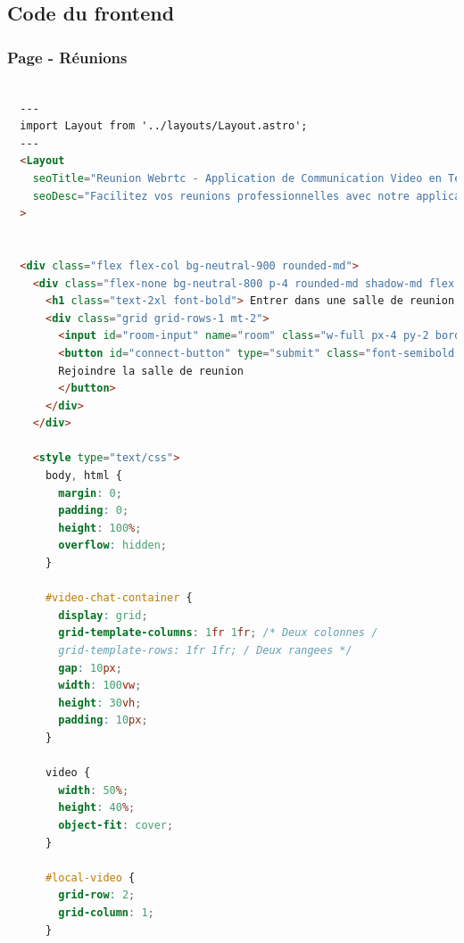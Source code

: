 \documentclass[12pt, a4paper, oneside]{thesis}
\begin{document}
\subsection{Code du frontend}

\subsubsection{Page - Réunions}

\begin{lstlisting}[language=HTML, caption={Page - Réunions}, label=Page - Reunions]

  ---
  import Layout from '../layouts/Layout.astro';
  ---
  <Layout
    seoTitle="Reunion Webrtc - Application de Communication Video en Temps Reel | Acody"
    seoDesc="Facilitez vos reunions professionnelles avec notre application de projet Webrtc. Effectuez des appels video en temps reel, abandonnez les appels en un clic, et gerez facilement le son et la camera. Optimisez votre collaboration a distance avec des fonctionnalites simples et efficaces."
  >
  
  
  <div class="flex flex-col bg-neutral-900 rounded-md">
    <div class="flex-none bg-neutral-800 p-4 rounded-md shadow-md flex flex-col">
      <h1 class="text-2xl font-bold"> Entrer dans une salle de reunion </h1>
      <div class="grid grid-rows-1 mt-2">
        <input id="room-input" name="room" class="w-full px-4 py-2 border rounded-md focus:outline-none focus:border-teal-500 bg-neutral-700 col-span-6" placeholder="Numero de votre salle de reunion" />
        <button id="connect-button" type="submit" class="font-semibold w-full bg-teal-500 text-white px-4 py-2 rounded-md hover:bg-teal-700 focus:outline-none col-start-8">
        Rejoindre la salle de reunion
        </button>
      </div>
    </div>
    
    <style type="text/css">
      body, html {
        margin: 0;
        padding: 0;
        height: 100%;
        overflow: hidden;
      }
    
      #video-chat-container {
        display: grid;
        grid-template-columns: 1fr 1fr; /* Deux colonnes /
        grid-template-rows: 1fr 1fr; / Deux rangees */
        gap: 10px;
        width: 100vw;
        height: 30vh;
        padding: 10px;
      }
    
      video {
        width: 50%;
        height: 40%;
        object-fit: cover;
      }
    
      #local-video {
        grid-row: 2;
        grid-column: 1;
      }
    

\end{lstlisting}
\end{document}
